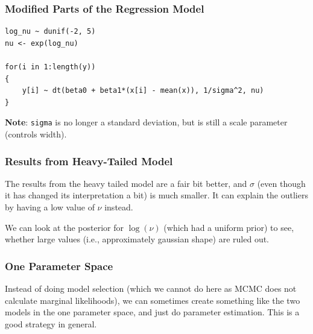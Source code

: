 \documentclass{beamer}
\begin{document}
\begin{frame}[fragile]
\frametitle{Modified Parts of the Regression Model}
\footnotesize
\begin{verbatim}
log_nu ~ dunif(-2, 5)
nu <- exp(log_nu)

for(i in 1:length(y))
{
    y[i] ~ dt(beta0 + beta1*(x[i] - mean(x)), 1/sigma^2, nu)
}
\end{verbatim}
\pause

{\bf Note}: \texttt{sigma} is no longer a standard deviation, but is still
a scale parameter (controls width).

\end{frame}


\begin{frame}[fragile]
\frametitle{Results from Heavy-Tailed Model}
The results from the heavy tailed model are a fair bit better,
and $\sigma$ (even though it has changed its interpretation a bit)
is much smaller. It can explain the outliers by having a low value
of $\nu$ instead.\\[0.5em]\pause

We can look at the posterior for $\log(\nu)$ (which had a uniform prior)
to see, whether large values (i.e., approximately gaussian shape) are ruled out.

\end{frame}

\begin{frame}[fragile]
\frametitle{One Parameter Space}
Instead of doing model selection (which we cannot do here as MCMC does not
calculate marginal likelihoods), we can sometimes create something like
the two models in the one parameter space, and just do parameter estimation.
This is a good strategy in general.

\end{frame}
\end{document}
